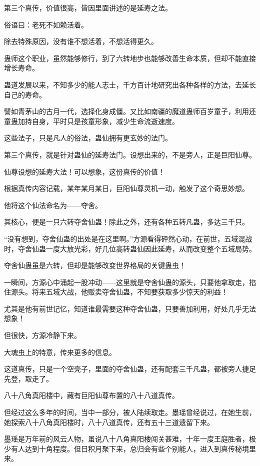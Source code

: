 
\begin{this_body}

第三个真传，价值很高，皆因里面讲述的是延寿之法。

俗语曰：老死不如赖活着。

除去特殊原因，没有谁不想活着，不想活得更久。

蛊师这个职业，虽然能够修行，到了六转地步也能够改善生命本质，但却不能直接增长寿命。

蛊道发展以来，不知多少的能人志士，千方百计地研究出各种各样的方法，去延长自己的寿命。

譬如青茅山的古月一代，选择化身成僵。又比如南疆的魔道蛊师百岁童子，利用还童蛊加持自身，平时只是孩童形象，减少生命流逝速度。

这些法子，只是凡人的俗法，蛊仙拥有更玄妙的法门。

第三个真传，就是针对蛊仙的延寿法门。设想出来的，不是旁人，正是巨阳仙尊。

仙尊设想的延寿大法！可以想象，这份真传的价值！

根据真传内容记载，某年某月某日，巨阳仙尊灵机一动，触发了这个奇思妙想。

他将这个仙法命名为——夺舍。

其核心，便是一只六转夺舍仙蛊！除此之外，还有各种五转凡蛊，多达三千只。

“没有想到，夺舍仙蛊的出处是在这里啊。”方源看得砰然心动，在前世，五域混战时，夺舍仙蛊一度大放光彩，好几位高转蛊仙因此延寿，从而改变整个五域局势。

夺舍仙蛊虽是六转，但却是能够改变世界格局的关键蛊虫！

一瞬间，方源心中涌起一股冲动——这里就是夺舍仙蛊的源头，只要他拿取走，掐住源头。将来五域大战，他贩卖夺舍仙蛊，不知要获取多少惊天的利益！

尤其是他有前世记忆，知道谁最需要这种夺舍仙蛊，只要善加利用，好处几乎无法想象！

但很快，方源冷静下来。

大魂虫上的特意，传来更多的信息。

这道真传，只是一个空壳子，里面的夺舍仙蛊，还有配套三千凡蛊，都被旁人捷足先登，取走了。

八十八角真阳楼中，藏有巨阳仙尊布置的八十八道真传。

但经过这么多年的时间，当中一部分，被人陆续取走。墨瑶曾经说过，在她生前，她探索八十八角真阳楼时，八十八道真传，还有五十三道遗留下来。

墨瑶是万年前的风云人物，虽说八十八角真阳楼闯关甚难，十年一度王庭胜者，极少有人达到十角程度。但日积月聚下来，总归会有些个别能人，进入到真传秘境里来。


\end{this_body}
